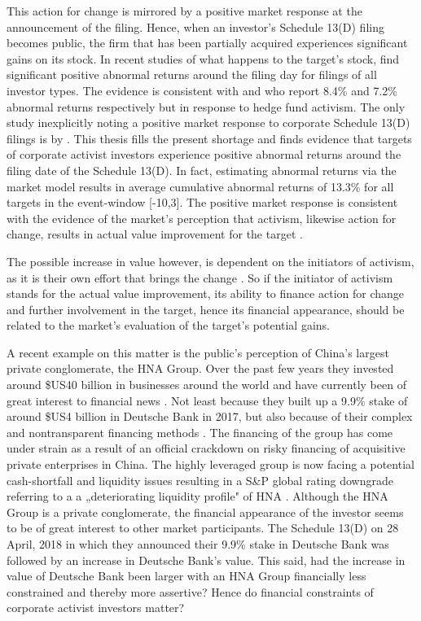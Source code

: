 \documentclass[12pt]{article}
\begin{document}
This action for change is mirrored by a positive market response at the announcement of the filing. Hence, when an investor's Schedule 13(D) filing becomes public, the firm that has been partially acquired experiences significant gains on its stock. In recent studies of what happens to the target's stock, \citet[p.1564]{Collin-Dufresne2015} find significant positive abnormal returns around the filing day for filings of all investor types. The evidence is consistent with \citet[p.1756]{Brav2008} and \citet[p.209]{Klein2009} who report 8.4\% and 7.2\% abnormal returns respectively but in response to hedge fund activism. The only study inexplicitly noting a positive market response to corporate Schedule 13(D) filings is by \citet[p.29]{Brigida2012}. This thesis fills the present shortage and finds evidence that targets of corporate activist investors experience positive abnormal returns around the filing date of the Schedule 13(D). In fact, estimating abnormal returns via the market model results in average cumulative abnormal returns of 13.3\% for all targets in the event-window [-10,3]. The positive market response is consistent with the evidence of the market's perception that activism, likewise action for change, results in actual value improvement for the target \citep[p.1760]{Brav2008}.\par
The possible increase in value however, is dependent on the initiators of activism, as it is their own effort that brings the change \citep[p.1563]{Collin-Dufresne2015}. So if the initiator of activism stands for the actual value improvement, its ability to finance action for change and further involvement in the target, hence its financial appearance, should be related to the market's evaluation of the target's potential gains.\par
A recent example on this matter is the public's perception of China's largest private conglomerate, the HNA Group. Over the past few years they invested around \$US40 billion in businesses around the world and have currently been of great interest to financial news \citep{Smith2018}. Not least because they built up a 9.9\% stake of around \$US4 billion in Deutsche Bank in 2017, but also because of their complex and nontransparent financing methods \citep{Lockett2018}.
The financing of the group has come under strain as a result of an official crackdown on risky financing of acquisitive private enterprises in China. The highly leveraged group is now facing a potential cash-shortfall and liquidity issues resulting in a S\&P global rating downgrade referring to a a „deteriorating liquidity profile" of HNA \citep{Schuetze2018}. Although the HNA Group is a private conglomerate, the financial appearance of the investor seems to be of great interest to other market participants. The Schedule 13(D) on 28 April, 2018 in which they announced their 9.9\% stake in Deutsche Bank was followed by an increase in Deutsche Bank's value. This said, had the increase in value of Deutsche Bank been larger with an HNA Group financially less constrained and thereby more assertive? Hence do financial constraints of corporate activist investors matter?\par
\end{document}
